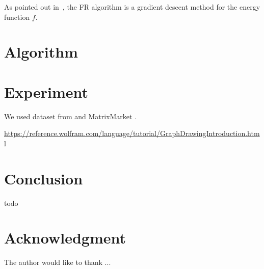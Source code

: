 \documentclass[journal]{IEEEtran}
\begin{document}
As pointed out in~\cite{tunkelang1999numerical},
the FR algorithm is a gradient descent method for the energy function $f$.


\section{Algorithm} \label{sec:algorithm}

\section{Experiment} \label{sec:experiment}

We used dataset from \cite{davis2011university} and MatrixMarket \cite{boisvertMatrixMarketWeb1997}.

\url{https://reference.wolfram.com/language/tutorial/GraphDrawingIntroduction.html}

\section{Conclusion} \label{sec:conclusion}

todo

\section*{Acknowledgment}

The author would like to thank ...

\end{document}
